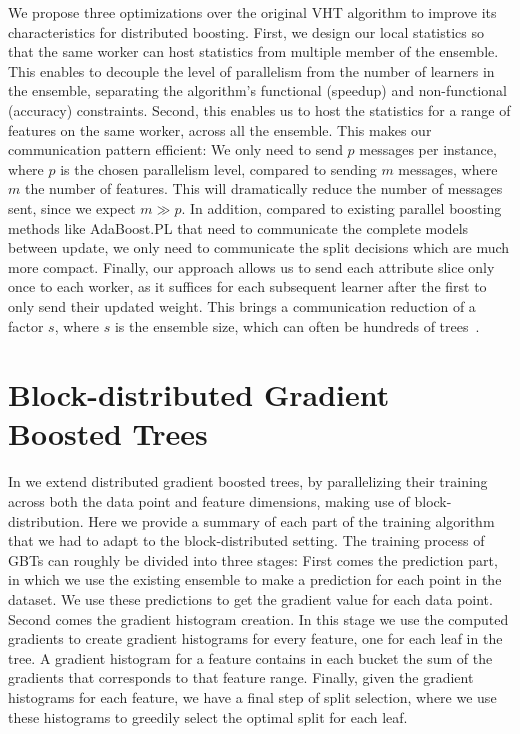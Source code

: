 We propose three optimizations over the original VHT algorithm to improve its
characteristics for distributed boosting. First, we design our local statistics
so that the same worker can host statistics from multiple member of the ensemble.
This enables to decouple the level of parallelism from the number of learners
in the ensemble, separating the algorithm's functional (speedup) and non-functional
(accuracy) constraints.
Second, this enables us to host the statistics for a range of features on the same
worker, across all the ensemble. This makes our communication pattern efficient:
We only need to send $p$  messages per instance, where $p$ is the chosen
parallelism level, compared to sending $m$ messages, where $m$ the
number of features. This will dramatically
reduce the number of messages sent, since we expect $m \gg p$. In addition, compared to existing
parallel boosting methods like AdaBoost.PL \cite{adaboost-pl} that need to communicate the complete
models between update, we only need to communicate the split decisions which are
much more compact.
Finally, our approach allows us to send each attribute slice only once to
each worker, as it suffices for each subsequent learner after the first
to only send their updated weight. This brings a communication reduction
of a factor $s$, where $s$ is the ensemble size, which can often be hundreds of
trees~\cite{hundreds-classifiers}.

\section{Block-distributed Gradient Boosted Trees}
\label{sec:block-gbt}

In \blockgbt we extend distributed gradient boosted trees, by parallelizing their
training across both the data point and feature dimensions, making use of block-distribution.
Here we provide a summary of each part of the training algorithm that we had to
adapt to the block-distributed setting.
The training process of GBTs can roughly be divided into three stages: First comes
the prediction part, in which we use the existing ensemble to make a prediction
for each point in the dataset. We use these predictions to get the gradient
value for each data point. Second comes the gradient histogram creation.
In this stage we use the computed gradients to create gradient histograms
for every feature, one for each leaf in the tree. A gradient histogram
for a feature contains in each bucket the sum of the gradients that corresponds to
that feature range. Finally, given the gradient histograms for each feature,
we have a final step of split selection, where we use these histograms to greedily
select the optimal split for each leaf.

